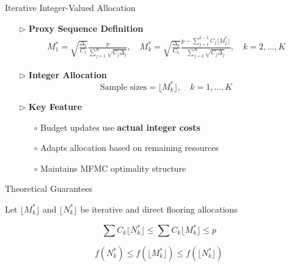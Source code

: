 \documentclass{beamer}
\begin{document}
\begin{frame}{Iterative Integer-Valued Allocation}
\begin{itemize}[leftmargin=5pt] 
\item[$\triangleright$] \textcolor{myblue3}{\bf Proxy Sequence Definition}
{\footnotesize
\begin{align*}
M_1^* = \sqrt{\frac{\Delta_1}{C_1}} \frac{p}{\sum_{j=1}^K \sqrt{C_j \Delta_j}}, \quad 
M_k^* = \sqrt{\frac{\Delta_k}{C_k}} \frac{p - \sum_{j=1}^{k-1} C_j \lfloor M_j^* \rfloor}{\sum_{j=k}^K \sqrt{C_j \Delta_j}}, \quad k = 2,\ldots,K
\end{align*}
}

\item[$\triangleright$] \textcolor{myblue3}{\bf Integer Allocation}
{\footnotesize
\[
\text{Sample sizes} = \lfloor M_k^* \rfloor, \quad k = 1,\ldots,K
\]
}

\item[$\triangleright$] \textcolor{myblue3}{\bf Key Feature}
{\footnotesize
\begin{itemize}[leftmargin=15pt] 
\item[$\circ$] Budget updates use \textbf{actual integer costs}
\item[$\circ$] Adapts allocation based on remaining resources
\item[$\circ$] Maintains MFMC optimality structure
\end{itemize}
}
\end{itemize}
\end{frame}








\begin{frame}{Theoretical Guarantees}

{\footnotesize
Let $\lfloor M_k^* \rfloor$ and $\lfloor N_k^* \rfloor$ be iterative and direct flooring allocations
}
\begin{theorem}
{\footnotesize
\[
\sum C_k \lfloor N_k^* \rfloor \leq \sum C_k \lfloor M_k^* \rfloor \leq p
\]
}
\end{theorem}

\begin{theorem}
{\footnotesize
\[
f(N_k^*) \leq f(\lfloor M_k^* \rfloor) \leq f(\lfloor N_k^* \rfloor)
\]
}
\end{theorem}
\end{frame}
\end{document}
